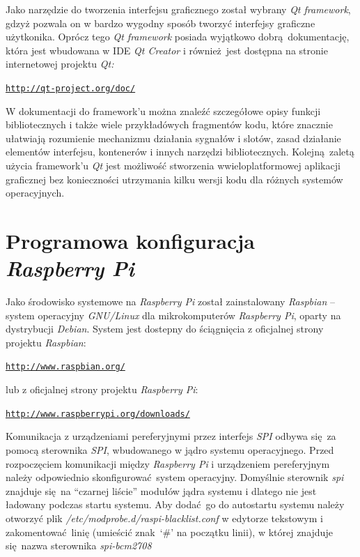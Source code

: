 \documentclass[eng,printmode]{mgr}
\begin{document}
Jako narzędzie do tworzenia interfejsu graficznego został wybrany \emph{Qt framework}, gdzyż pozwala on w bardzo wygodny sposób tworzyć interfejsy graficzne użytkonika. Oprócz tego \emph{Qt framework} posiada wyjątkowo dobrą dokumentację, która jest wbudowana w IDE \emph{Qt Creator} i również jest dostępna na stronie internetowej projektu \emph{Qt:} 

\begin{alltt}
    \url{http://qt-project.org/doc/}
\end{alltt}

W dokumentacji do framework'u można znaleźć szczegółowe opisy funkcji bibliotecznych i także wiele przykładówych fragmentów kodu, które znacznie ułatwiają rozumienie mechanizmu działania sygnałów i slotów, zasad działanie elementów interfejsu, kontenerów i innych narzędzi bibliotecznych. Kolejną zaletą użycia framework'u \emph{Qt} jest możliwość stworzenia wwieloplatformowej aplikacji graficznej bez konieczności utrzymania kilku wersji kodu dla różnych systemów operacyjnych. 



\section{Programowa konfiguracja \emph{Raspberry Pi}}
Jako środowisko systemowe na \emph{Raspberry Pi} został zainstalowany \emph{Raspbian} -- system operacyjny \emph{GNU/Linux} dla mikrokomputerów \emph{Raspberry Pi}, oparty na dystrybucji \emph{Debian}. System jest dostepny do ściągnięcia z oficjalnej strony projektu \emph{Raspbian}: 

\begin{alltt}
    \url{http://www.raspbian.org/} 
\end{alltt}

lub z oficjalnej strony projektu \emph{Raspberry Pi}:

\begin{alltt}
    \url{http://www.raspberrypi.org/downloads/}
\end{alltt}

Komunikacja z urządzeniami pereferyjnymi przez interfejs \emph{SPI} odbywa się za pomocą sterownika \emph{SPI}, wbudowanego w jądro systemu operacyjnego. Przed rozpoczęciem komunikacji między \emph{Raspberry Pi} i urządzeniem pereferyjnym należy odpowiednio skonfigurować system operacyjny.
Domyślnie sterownik \emph{spi} znajduje się na ``czarnej liście'' modułów jądra systemu i dlatego nie jest ładowany podczas startu systemu.
Aby dodać go do autostartu systemu należy otworzyć plik \emph{/etc/modprobe.d/raspi-blacklist.conf} w edytorze tekstowym i zakomentować linię (umieścić znak `\#' na początku linii), w której znajduje się nazwa sterownika \emph{spi-bcm2708}
\end{document}
